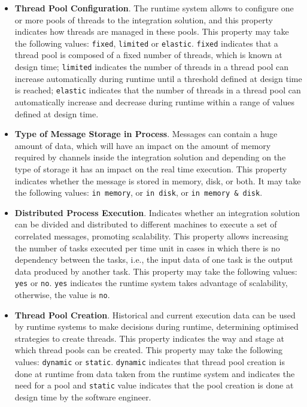 \begin{itemize}
\item \textbf{Thread Pool Configuration}. The runtime system allows to configure one or more pools of threads to the integration solution, and this property indicates how threads are managed in these pools. This property may take the following values: \texttt{fixed}, \texttt{limited} or \texttt{elastic}. \texttt{fixed} indicates that a thread pool is composed of a fixed number of threads, which is known at design time; \texttt{limited} indicates the number of threads in a thread pool can increase automatically during runtime until a threshold defined at design time is reached; \texttt{elastic} indicates that the number of threads in a thread pool can automatically increase and decrease during runtime within a range of values defined at design time.
%
\item \textbf{Type of Message Storage in Process}. Messages can contain a huge amount of data, which will have an impact on the amount of memory required by channels inside the integration solution and depending on the type of storage it has an impact on the real time execution. This property indicates whether the message is stored in memory, disk, or both. It may take the following values: \texttt{in memory}, or \texttt{in disk}, or \texttt{in memory \& disk}.
%
\item \textbf{Distributed Process Execution}. Indicates whether an integration solution can be divided and distributed to different machines to execute a set of correlated messages, promoting scalability. This property allows increasing the number of tasks executed per time unit in cases in which there is no dependency between the tasks, i.e., the input data of one task is the output data produced by another task. This property may take the following values: \texttt{yes} or \texttt{no}. \texttt{yes} indicates the runtime system takes advantage of scalability, otherwise, the value is \texttt{no}.
%	
\item \textbf{Thread Pool Creation}. Historical and current execution data can be used by runtime systems to make decisions during runtime, determining optimised strategies to create threads. This property indicates the way and stage at which thread pools can be created. This property may take the following values: \texttt{dynamic} or \texttt{static}. \texttt{dynamic} indicates that thread pool creation is done at runtime from data taken from the runtime system and indicates the need for a pool and \texttt{static} value indicates that the pool creation is done at design time by the software engineer.	
\end{itemize}
%
